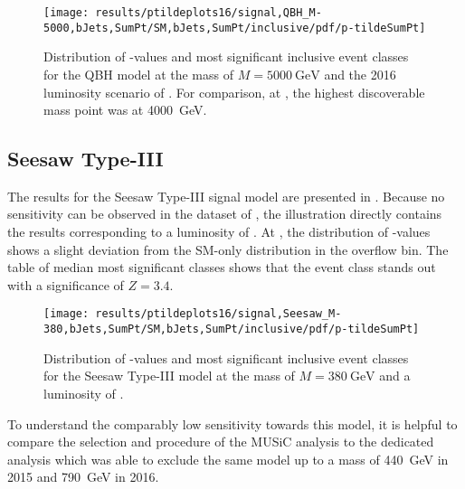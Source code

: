\begin{figure}[p]
    \centering
    \texttt{[image: results/ptildeplots16/signal,QBH\_M-5000,bJets,SumPt/SM,bJets,SumPt/inclusive/pdf/p-tildeSumPt]}
    {   
        \setlength{\tabcolsep}{1em}
        
    }
    \caption{Distribution of \ptilde-values and most significant inclusive event classes for the \acl{QBH} model at the mass of $M = \SI{5000}{\GeV}$ and the 2016 luminosity scenario of \lumiB. For comparison, at \lumiA, the highest discoverable mass point was at \SI{4000}{\GeV}.}
    \label{fig:result_qbh_5000}
\end{figure}


\subsection{Seesaw Type-III}
\label{sec:results_seesaw}

The results for the Seesaw Type-III signal model are presented in . Because no sensitivity can be observed in the dataset of \lumiA, the illustration directly contains the results corresponding to a luminosity of \lumiB.
At \lumiB, the distribution of \ptilde-values shows a slight deviation from the \ac{SM}-only distribution in the overflow bin. The table of median most significant classes shows that the event class  stands out with a significance of $Z = \num{3.4}$.

\begin{figure}[p]
    \centering
    \texttt{[image: results/ptildeplots16/signal,Seesaw\_M-380,bJets,SumPt/SM,bJets,SumPt/inclusive/pdf/p-tildeSumPt]}
    {
        \setlength{\tabcolsep}{1em}
        
    }
    \caption{Distribution of \ptilde-values and most significant inclusive event classes for the Seesaw Type-III model at the mass of $M = \SI{380}{\GeV}$ and a luminosity of \lumiB.}
    \label{fig:result_seesaw}
\end{figure}

To understand the comparably low sensitivity towards this model, it is helpful to compare the selection and procedure of the \ac{MUSiC} analysis to the dedicated analysis which was able to exclude the same model up to a mass of \SI{440}{\GeV} in 2015\cite{CMS:CMS-PAS-EXO-16-002} and \SI{790}{\GeV} in 2016\cite{CMS:CMS-PAS-EXO-17-006}.


